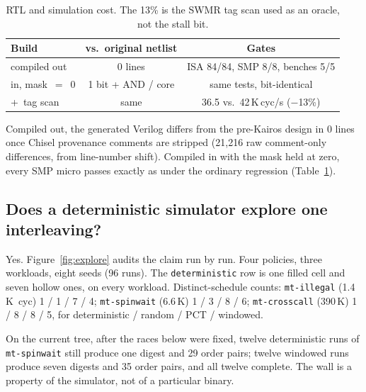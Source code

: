 \documentclass[sigconf,anonymous,review]{acmart}
\begin{document}
\begin{table}[ht]
\caption{RTL and simulation cost. The 13\% is the SWMR tag scan used as
an oracle, not the stall bit.}
\label{tab:overhead}
\centering
\small
\begin{tabular}{@{}lcc@{}}
\toprule
Build & vs.\ original netlist & Gates \\
\midrule
compiled out
  & 0 lines
  & ISA 84/84, SMP 8/8, benches 5/5 \\
in, mask~$=$~0
  & 1 bit + AND / core
  & same tests, bit-identical \\
+~tag scan
  & same
  & 36.5 vs.\ 42\,K\,cyc/s ($-$13\%) \\
\bottomrule
\end{tabular}
\end{table}

Compiled out, the generated Verilog differs from the pre-Kairos design
in 0 lines once Chisel provenance comments are stripped (21{,}216 raw
comment-only differences, from line-number shift). Compiled in with the
mask held at zero, every SMP micro passes exactly as under the ordinary
regression (Table~\ref{tab:overhead}).

\subsection{Does a deterministic simulator explore one interleaving?}
\label{sec:one}

Yes. Figure~\ref{fig:explore} audits the claim run by run. Four
policies, three workloads, eight seeds (96 runs). The
\texttt{deterministic} row is one filled cell and seven hollow ones,
on every workload. Distinct-schedule counts: \texttt{mt-illegal} (1.4\,K~cyc)
1 / 1 / 7 / 4; \texttt{mt-spinwait} (6.6\,K)
1 / 3 / 8 / 6; \texttt{mt-crosscall} (390\,K)
1 / 8 / 8 / 5, for deterministic / random / PCT / windowed.

On the current tree, after the races below were fixed, twelve
deterministic runs of \texttt{mt-spinwait} still produce one digest
and 29 order pairs; twelve windowed runs produce seven digests and 35
order pairs, and all twelve complete. The wall is a property of the
simulator, not of a particular binary.
\end{document}
